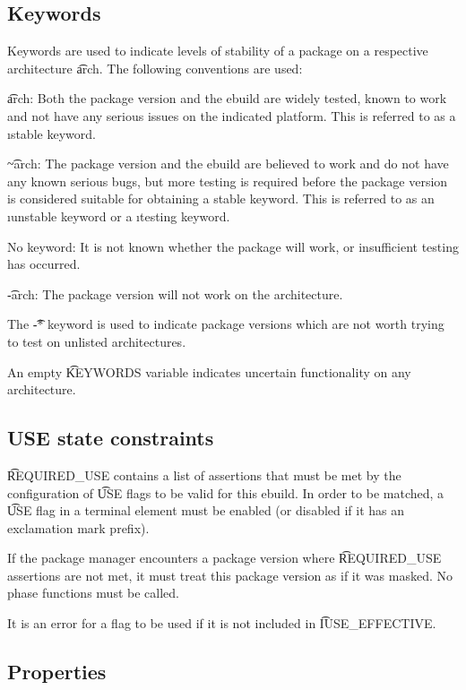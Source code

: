 \subsection{Keywords}
\label{sec:keywords}

Keywords are used to indicate levels of stability of a package on a respective architecture
\t{arch}. The following conventions are used:
\begin{compactitem}
\item \t{arch}: Both the package version and the ebuild are widely tested, known to work and not
    have any serious issues on the indicated platform. This is referred to as a \i{stable keyword}.
\item \t{\textasciitilde arch}: The package version and the ebuild are believed to work and do
    not have any known serious bugs, but more testing is required before the package version is
    considered suitable for obtaining a stable keyword. This is referred to as an \i{unstable
    keyword} or a \i{testing keyword}.
\item No keyword: It is not known whether the package will work, or insufficient testing has
    occurred.
\item \t{-arch}: The package version will not work on the architecture.
\end{compactitem}
The \t{-*} keyword is used to indicate package versions which are not worth trying to test on
unlisted architectures.

An empty \t{KEYWORDS} variable indicates uncertain functionality on any architecture.

\subsection{USE state constraints}
\label{sec:required-use}

\t{REQUIRED_USE} contains a list of assertions that must be met by the configuration of \t{USE}
flags to be valid for this ebuild. In order to be matched, a \t{USE} flag in a terminal element
must be enabled (or disabled if it has an exclamation mark prefix).

If the package manager encounters a package version where \t{REQUIRED_USE} assertions are not met,
it must treat this package version as if it was masked. No phase functions must be called.

It is an error for a flag to be used if it is not included in \t{IUSE_EFFECTIVE}.

\subsection{Properties}
\label{sec:properties}

